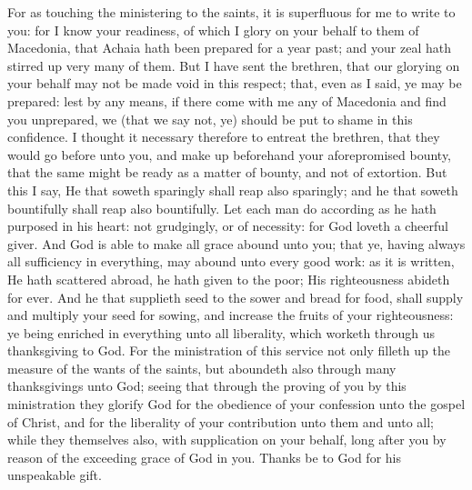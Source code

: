 For as touching the ministering to the saints, it is superfluous for me to write to you: for I know your readiness, of which I glory on your behalf to them of Macedonia, that Achaia hath been prepared for a year past; and your zeal hath stirred up very many of them. But I have sent the brethren, that our glorying on your behalf may not be made void in this respect; that, even as I said, ye may be prepared: lest by any means, if there come with me any of Macedonia and find you unprepared, we (that we say not, ye) should be put to shame in this confidence. I thought it necessary therefore to entreat the brethren, that they would go before unto you, and make up beforehand your aforepromised bounty, that the same might be ready as a matter of bounty, and not of extortion.  But this I say, He that soweth sparingly shall reap also sparingly; and he that soweth bountifully shall reap also bountifully. Let each man do according as he hath purposed in his heart: not grudgingly, or of necessity: for God loveth a cheerful giver. And God is able to make all grace abound unto you; that ye, having always all sufficiency in everything, may abound unto every good work: as it is written, He hath scattered abroad, he hath given to the poor; His righteousness abideth for ever.  And he that supplieth seed to the sower and bread for food, shall supply and multiply your seed for sowing, and increase the fruits of your righteousness: ye being enriched in everything unto all liberality, which worketh through us thanksgiving to God. For the ministration of this service not only filleth up the measure of the wants of the saints, but aboundeth also through many thanksgivings unto God; seeing that through the proving of you by this ministration they glorify God for the obedience of your confession unto the gospel of Christ, and for the liberality of your contribution unto them and unto all; while they themselves also, with supplication on your behalf, long after you by reason of the exceeding grace of God in you. Thanks be to God for his unspeakable gift. 

